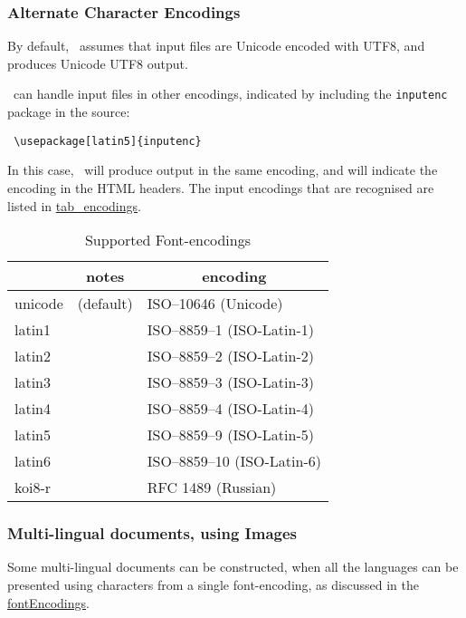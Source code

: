 \subsubsection{Alternate Character Encodings\label{fontEncodings}}%
%
%
\html{\\}%
By default, \latextohtml\ assumes that input files are
Unicode encoded with UTF8, and produces Unicode UTF8 output.

\latextohtml\ can handle input files in other encodings,
indicated by including the \texttt{inputenc}
package in the source:
%
\begin{small}
\begin{verbatim}
 \usepackage[latin5]{inputenc}
\end{verbatim}
\end{small}
In this case, \latextohtml\ will produce output in the
same encoding, and will indicate the encoding in the HTML
headers.
The input encodings that are recognised are listed in 
\hyperref{the following table}{Table~}{}{tab_encodings}.

\begin{table}
\begin{center}
\begin{tabular}{|>{\ttfamily}lcl|}%
\multicolumn{1}{c}{\textbf{extension}}
&\multicolumn{1}{c}{\textbf{notes}}
&\multicolumn{1}{c}{\textbf{encoding}}\\\hline
unicode & (default)& ISO--10646 (Unicode)\\
latin1 &  & ISO--8859--1 (ISO-Latin-1) \\
latin2 &  & ISO--8859--2 (ISO-Latin-2) \\
latin3 &  & ISO--8859--3 (ISO-Latin-3) \\
latin4 &  & ISO--8859--4 (ISO-Latin-4) \\
latin5 &  & ISO--8859--9 (ISO-Latin-5) \\
latin6 &  & ISO--8859--10 (ISO-Latin-6)\\
koi8-r &  & RFC 1489 (Russian) \\\hline
\end{tabular}
\caption{Supported Font-encodings\label{tab_encodings}}
\end{center}
\end{table}


\subsubsection{Multi-lingual documents, using Images\label{multilang}}%
%
Some multi-lingual documents can be constructed, when all the languages
can be presented using characters from a single font-encoding,
as discussed in the \hyperref{previous section}{Section~}{}{fontEncodings}.

